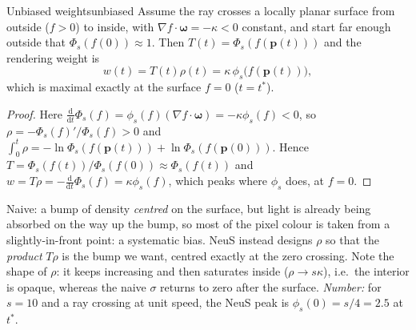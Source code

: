 \documentclass[11pt,a4paper]{article}
\newcommand{\bp}{{\bm{p}}}
\newcommand{\bom}{{\bm{\omega}}}
\begin{document}
\begin{Proposition}{Unbiased weights}{unbiased}
Assume the ray crosses a locally planar surface from outside ($f>0$) to inside, with $\nabla f\cdot\bom=-\kappa<0$ constant,
and start far enough outside that $\Phi_s(f(0))\approx1$. Then $T(t)=\Phi_s(f(\bp(t)))$ and the rendering weight is
\[
w(t)=T(t)\rho(t)=\kappa\,\phi_s\bigl(f(\bp(t))\bigr),
\]
which is maximal exactly at the surface $f=0$ ($t=t^*$).
\end{Proposition}
\begin{proof}
Here $\frac{\mathrm d}{\mathrm dt}\Phi_s(f)=\phi_s(f)(\nabla f\cdot\bom)=-\kappa\phi_s(f)<0$, so $\rho=-\Phi_s(f)'/\Phi_s(f)>0$ and
$\int_0^t\rho=-\ln\Phi_s(f(\bp(t)))+\ln\Phi_s(f(\bp(0)))$. Hence $T=\Phi_s(f(t))/\Phi_s(f(0))\approx\Phi_s(f(t))$ and
$w=T\rho=-\frac{\mathrm d}{\mathrm dt}\Phi_s(f)=\kappa\phi_s(f)$, which peaks where $\phi_s$ does, at $f=0$.
\end{proof}
\begin{intuition}
Naive: a bump of density \emph{centred} on the surface, but light is already being absorbed on the way up the bump, so
most of the pixel colour is taken from a slightly-in-front point: a systematic bias. NeuS instead designs $\rho$ so that
the \emph{product} $T\rho$ is the bump we want, centred exactly at the zero crossing. Note the shape of $\rho$: it keeps
increasing and then saturates inside ($\rho\to s\kappa$), i.e.\ the interior is opaque, whereas the naive $\sigma$ returns to zero after the surface.
\emph{Number:} for $s=10$ and a ray crossing at unit speed, the NeuS peak is $\phi_s(0)=s/4=2.5$ at $t^*$.
\end{intuition}
\end{document}
